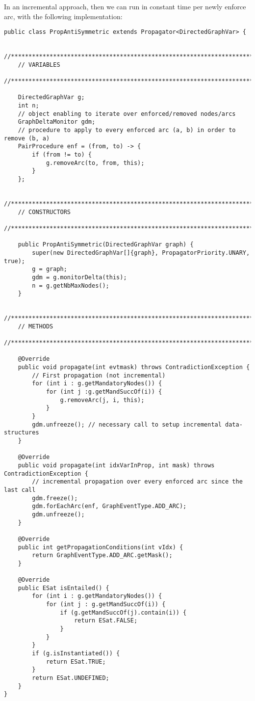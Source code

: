 \documentclass{article}
\begin{document}
In an incremental approach, then we can run in constant time per newly enforce arc, with the following implementation:
\begin{lstlisting}
public class PropAntiSymmetric extends Propagator<DirectedGraphVar> {

    //***********************************************************************
    // VARIABLES
    //***********************************************************************

    DirectedGraphVar g;
    int n;
    // object enabling to iterate over enforced/removed nodes/arcs
    GraphDeltaMonitor gdm;
    // procedure to apply to every enforced arc (a, b) in order to remove (b, a)
    PairProcedure enf = (from, to) -> {
        if (from != to) {
            g.removeArc(to, from, this);
        }
    };

    //***********************************************************************
    // CONSTRUCTORS
    //***********************************************************************

    public PropAntiSymmetric(DirectedGraphVar graph) {
        super(new DirectedGraphVar[]{graph}, PropagatorPriority.UNARY, true);
        g = graph;
        gdm = g.monitorDelta(this);
        n = g.getNbMaxNodes();
    }

    //***********************************************************************
    // METHODS
    //***********************************************************************

    @Override
    public void propagate(int evtmask) throws ContradictionException {
        // First propagation (not incremental)
        for (int i : g.getMandatoryNodes()) {
            for (int j :g.getMandSuccOf(i)) {
                g.removeArc(j, i, this);
            }
        }
        gdm.unfreeze(); // necessary call to setup incremental data-structures
    }

    @Override
    public void propagate(int idxVarInProp, int mask) throws ContradictionException {
        // incremental propagation over every enforced arc since the last call
        gdm.freeze();
        gdm.forEachArc(enf, GraphEventType.ADD_ARC);
        gdm.unfreeze();
    }

    @Override
    public int getPropagationConditions(int vIdx) {
        return GraphEventType.ADD_ARC.getMask();
    }

    @Override
    public ESat isEntailed() {
        for (int i : g.getMandatoryNodes()) {
            for (int j : g.getMandSuccOf(i)) {
                if (g.getMandSuccOf(j).contain(i)) {
                    return ESat.FALSE;
                }
            }
        }
        if (g.isInstantiated()) {
            return ESat.TRUE;
        }
        return ESat.UNDEFINED;
    }
}
\end{lstlisting}
\end{document}
